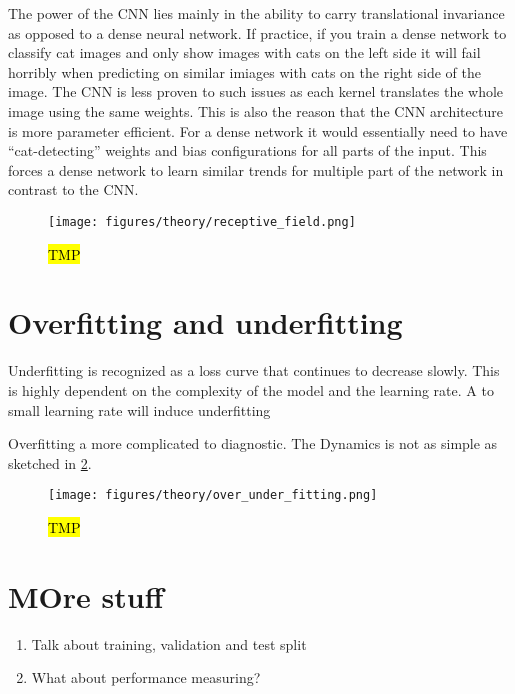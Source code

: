 The power of the \acrshort{CNN} lies mainly in the ability to carry
translational invariance as opposed to a dense neural network. If practice, if
you train a dense network to classify cat images and only show images with cats
on the left side it will fail horribly when predicting on similar imiages with
cats on the right side of the image. The \acrshort{CNN} is less proven to such
issues as each kernel translates the whole image using the same weights. This is
also the reason that the \acrshort{CNN} architecture is more parameter
efficient. For a dense network it would essentially need to have
``cat-detecting'' weights and bias configurations for all parts of the input.
This forces a dense network to learn similar trends for multiple part of the
network in contrast to the \acrshort{CNN}.



\begin{figure}[H]
  \centering
  \texttt{[image: figures/theory/receptive\_field.png]}
  \caption{\hl{TMP}}
  \label{fig:receptive_field}
\end{figure}


\section{Overfitting and underfitting}



Underfitting is recognized as a loss curve that continues to decrease slowly. This is highly dependent on the complexity of the model and the learning rate. A to small learning rate will induce underfitting

Overfitting a more complicated to diagnostic. The Dynamics is not as simple as sketched in \cref{fig:over_under_fitting}.


\begin{figure}[H]
  \centering
  \texttt{[image: figures/theory/over\_under\_fitting.png]}
  \caption{\hl{TMP} \cite{smith2018disciplined}}
  \label{fig:over_under_fitting}
\end{figure}

\section{MOre stuff}
\begin{enumerate}
  \item Talk about training, validation and test split
  \item What about performance measuring?
\end{enumerate}



